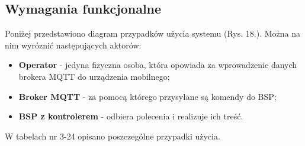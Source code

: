\subsection{Wymagania funkcjonalne}
Poniżej przedstawiono diagram przypadków użycia systemu (Rys. 18.). Można na nim wyróznić następujących aktorów:
\begin{itemize}
\item \textbf{Operator} - jedyna fizyczna osoba, która opowiada za wprowadzenie danych brokera MQTT do urządzenia mobilnego;
\item \textbf{Broker MQTT} - za pomocą którego przysyłane są komendy do BSP;
\item \textbf{BSP z kontrolerem} - odbiera polecenia i realizuje ich treść.
\end{itemize}
W tabelach nr 3-24 opisano poszczególne przypadki użycia.
